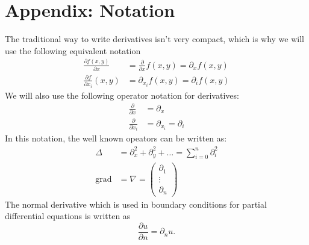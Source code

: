 %
% 
%
%
\section{Appendix: Notation}
The traditional way to write derivatives isn't very compact, which is why
we will use the following equivalent notation
\begin{align*}
\frac{\partial f(x,y)}{\partial x}
&=\frac{\partial}{\partial x}f(x,y)
=\partial_x f(x,y)\\
\frac{\partial f}{\partial x_i}(x,y)
&=\partial_{x_i}f(x,y)=\partial_if(x,y)
\end{align*}
We will also use the following operator notation for derivatives:
\begin{align*}
\frac{\partial}{\partial x}
&=
\partial_x\\
\frac{\partial}{\partial x_i}
&=
\partial_{x_i}
=\partial_i
\end{align*}
In this notation, the well known opeators can be written as:
\begin{align*}
\Delta &=\partial_x^2+\partial_y^2+\dots=\sum_{i=0}^n\partial_i^2\\
\operatorname{grad}&=\nabla=\begin{pmatrix}\partial_1\\\vdots\\\partial_n\end{pmatrix}
\end{align*}
The normal derivative which is used in boundary conditions for partial
differential equations is written as
\[
\frac{\partial u}{\partial n}=\partial_nu.
\]

